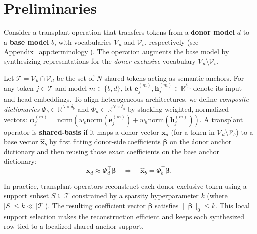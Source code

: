\vspace{-2mm}
\section{Preliminaries}
\label{sec:prelim}

 

\begin{definition}
\label{def:shared_basis}
Consider a transplant operation that transfers tokens from a \textbf{donor model} $d$ to a \textbf{base model} $b$, with vocabularies $\mathcal{V}_d$ and $\mathcal{V}_b$, respectively (see Appendix~\ref{app:terminology}). The operation augments the base model by synthesizing representations for the \textit{donor-exclusive} vocabulary $\mathcal{V}_d \setminus \mathcal{V}_b$.

Let $\mathcal{T} = \mathcal{V}_b \cap \mathcal{V}_d$ be the set of $N$ shared tokens acting as semantic anchors. For any token $j \in \mathcal{T}$ and model $m \in \{b, d\}$, let $\mathbf{e}^{(m)}_j, \mathbf{h}^{(m)}_j \in \mathbb{R}^{\delta_m}$ denote its input and head embeddings. To align heterogeneous architectures, we define \emph{composite dictionaries} $\Phi_b\in\mathbb{R}^{N\times\delta_b}$ and $\Phi_d\in\mathbb{R}^{N\times\delta_d}$ by stacking weighted, normalized vectors:
$
\boldsymbol{\phi}^{(m)}_j = \mathrm{norm}\left(w_e \mathrm{norm}(\mathbf{e}^{(m)}_j) + w_h \mathrm{norm}(\mathbf{h}^{(m)}_j)\right).
$
A transplant operator is \textbf{shared-basis} if it maps a donor vector $\mathbf{x}_d$ (for a token in $\mathcal{V}_d \setminus \mathcal{V}_b$) to a base vector $\widehat{\mathbf{x}}_b$ by first fitting donor-side coefficients $\boldsymbol{\beta}$ on the donor anchor dictionary and then reusing those exact coefficients on the base anchor dictionary:
 \begin{equation}
\label{eq:transplant}
\mathbf{x}_d\approx \Phi_d^\top \boldsymbol{\beta}
\quad\Longrightarrow\quad
\widehat{\mathbf{x}}_b = \Phi_b^\top \boldsymbol{\beta}.
\end{equation}
\end{definition}
In practice, transplant operators reconstruct each donor-exclusive token using a support subset $S \subseteq \mathcal{T}$ constrained by a sparsity hyperparameter $k$ (where $|S| \le k \ll |\mathcal{T}|$).
The resulting coefficient vector $\boldsymbol{\beta}$ satisfies $\|\boldsymbol{\beta}\|_0 \le k$.
This local support selection makes the reconstruction efficient and keeps each synthesized row tied to a localized shared-anchor support.


